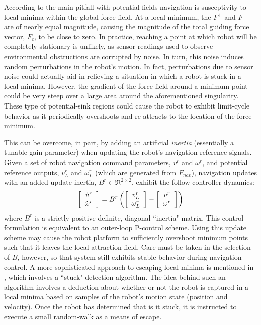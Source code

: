 		According to \cite{Koren1991} the main pitfall with potential-fields navigation is susceptivity to local minima within the global force-field. At a local minimum, the $F^{+}$ and $F^{-}$ are of nearly equal magnitude, causing the magnitude of the total guiding force vector, $F_{c}$, to be close to zero. In practice, reaching a point at which robot will be completely stationary is unlikely, as sensor readings used to observe environmental obstructions are corrupted by noise. In turn, this noise induces random perturbations in the robot's motion. In fact, perturbations due to sensor noise could actually aid in relieving a situation in which a robot is stuck in a local minima. However, the gradient of the force-field around a minimum point could be very steep over a large area around the aforementioned singularity. These type of potential-sink regions could cause the robot to exhibit limit-cycle behavior as it periodically overshoots and re-attracts to the location of the force-minimum. 

		This can be overcome, in part, by adding an artificial \emph{inertia} (essentially a tunable gain parameter) when updating the robot's navigation reference signals. Given a set of robot navigation command parameters, $v^{r}$ and $\omega^{r}$, and potential reference outputs, $v^{r}_{L}$ and $\omega^{r}_{L}$ (which are generated from $F_{nav}$), navigation updates with an added update-inertia, $B^{r}\in\Re^{2\times2}$, exhibit the follow controller dynamics:
			\begin{equation}
				\left[
					\begin{array}{c}
						\dot{v}^{r} 		\\
						\dot{\omega}^{r}
					\end{array}
				\right] = 
				B^{r}
				\left(
					\left[
						\begin{array}{c}
							v^{r}_{L} 	\\
							\omega^{r}_{L}
						\end{array}
					\right]
					-
					\left[
						\begin{array}{c}
							v^{r} 	\\
							\omega^{r}
						\end{array}
					\right]
				\right)
			\end{equation}
		where $B^{r}$ is a strictly positive definite, diagonal ``inertia" matrix. This control formulation is equivalent to an outer-loop P-control scheme. Using this update scheme may cause the robot platform to sufficiently overshoot minimum points such that it leaves the local attraction field. Care must be taken in the selection of $B$, however, so that system still exhibits stable behavior during navigation control. A more sophisticated approach to escaping local minima is mentioned in \cite{Krishnamurthy2007}, which involves a ``stuck" detection algorithm. The idea behind such an algorithm involves a deduction about whether or not the robot is captured in a local minima based on samples of the robot’s motion state (\IE position and velocity). Once the robot has determined that is it stuck, it is instructed to execute a small random-walk as a means of escape. 


